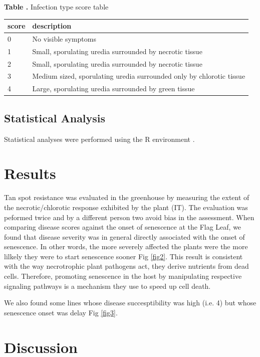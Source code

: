 \documentclass{frontiersSCNS} %
\begin{document}
\begin{table}[!t]
\textbf{\label{Tab:02} Table .}{ Infection type score table}\\
\processtable{}
{\begin{tabular}{l|l}
\hline
	score & description \\\midrule
	0 & No visible symptoms \\
	1  & Small, sporulating uredia surrounded by necrotic tissue \\
	2 & Small, sporulating uredia surrounded by necrotic tissue \\
	3 & Medium sized, sporulating uredia surrounded only by chlorotic tissue \\
	4 & Large, sporulating uredia surrounded by green tissue \\ \hline
\end{tabular}}{}
\end{table}


\subsection{Statistical Analysis}
Statistical analyses were performed using the R environment \cite{RManual}. 

\section{Results}
Tan spot resistance was evaluated in the greenhouse by measuring the extent of the necrotic/chlorotic response exhibited by the plant (IT). The evaluation was peformed twice and by a different person two avoid bias in the assessment. When comparing disease scores against the onset of senescence at the Flag Leaf, we found that disease severity was in general directly associated with the onset of senescence. In other words, the more severely affected the plants were the more lilkely they were to start senescence sooner Fig \ref{fig2}. This result is consistent with the way necrotrophic plant pathogens act, they derive nutrients from dead cells. Therefore, promoting senescence in the host by manipulating respective signaling pathways is a mechanism they use to speed up cell death. 

We also found some lines whose disease succesptibility was high (i.e. 4) but whose senescence onset was delay Fig \ref{fig3}. 


\section{Discussion}
\end{document}
